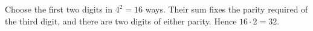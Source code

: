 Choose the first two digits in $4^2=16$ ways. Their sum fixes the parity required of the third digit, and there are two digits of either parity. Hence $16\cdot2=\boxed{32}$.
